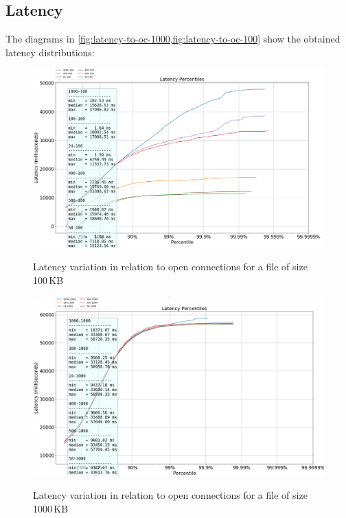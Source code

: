 \documentclass[runningheads]{llncs}
\begin{document}
\subsection{Latency}\label{subsec:latency}
The diagrams in \cref{fig:latency-to-oc-1000,fig:latency-to-oc-100} show the obtained latency distributions:
\begin{figure}[H]
    \centering
    \begin{minipage}{0.49\textwidth}
        \centering
        \includegraphics[width=1\textwidth]{plotfile100.png}\vspace{-1em}
        \caption{Latency variation in relation to open connections for a file of size 100\,KB}\vspace{-1.5em}
			\label {fig:latency-to-oc-100}
    \end{minipage}\hfill
    \begin{minipage}{0.49\textwidth}
        \centering
        \includegraphics[width=1\textwidth]{plotfile1000.png}\vspace{-1em}
        \caption{Latency variation in relation to open connections for a file of size 1000\,KB}\vspace{-1.5em}
	   \label {fig:latency-to-oc-1000}
    \end{minipage}
\end{figure}
\end{document}
